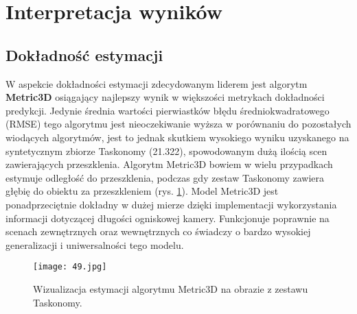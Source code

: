\begin{table}[H]
    \centering
    \caption{Średnie wartości wyników uzyskanych przez algorytmy.}
    \vspace{0.1cm}
\label{table:metrics}
\end{table}

\section{Interpretacja wyników}
\subsection{Dokładność estymacji}
W aspekcie dokładności estymacji zdecydowanym liderem jest algorytm \textbf{Metric3D} osiągający najlepszy wynik w większości metrykach dokładności predykcji. Jedynie średnia wartości pierwiastków błędu średniokwadratowego (RMSE) tego algorytmu jest nieoczekiwanie wyższa w porównaniu do pozostałych wiodących algorytmów, jest to jednak skutkiem wysokiego wyniku uzyskanego na syntetycznym zbiorze Taskonomy (21.322), spowodowanym dużą ilością scen zawierających przeszklenia. Algorytm Metric3D bowiem w wielu przypadkach estymuje odległość do przeszklenia, podczas gdy zestaw Taskonomy zawiera głębię do obiektu za przeszkleniem (rys. \ref{fig:metric3d-taskonomy}). Model Metric3D jest ponadprzeciętnie dokładny w dużej mierze dzięki implementacji wykorzystania informacji dotyczącej długości ogniskowej kamery. Funkcjonuje poprawnie na scenach zewnętrznych oraz wewnętrznych co świadczy o bardzo wysokiej generalizacji i uniwersalności tego modelu.
\begin{figure}[H]
    \centering
    \texttt{[image: 49.jpg]}
    \caption{Wizualizacja estymacji algorytmu Metric3D na obrazie z zestawu Taskonomy.}
    \label{fig:metric3d-taskonomy}
\end{figure}

